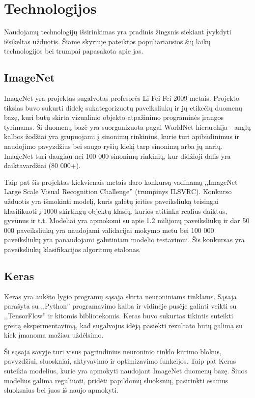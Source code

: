 \documentclass{VUMIFPSkursinis}
\begin{document}
\section{Technologijos}
Naudojamų technologijų išsirinkimas yra pradinis žingsnis siekiant įvykdyti išsikeltas užduotis. Šiame skyriuje pateiktos populiariausios šių laikų technologijos 
bei trumpai papasakota apie jas.

\subsection{ImageNet}
ImageNet yra projektas sugalvotas profesorės Li Fei-Fei 2009 metais. Projekto tikslas buvo sukurti didelę sukategorizuotų paveiksliukų ir jų etikečių duomenų bazę, 
kuri butų skirta vizualinio objekto atpažinimo programinės įrangos tyrimams. Ši duomenų bazė yra suorganizuota pagal WorldNet hierarchija - anglų kalbos žodžiai 
yra grupuojami į sinonimų rinkinius, kurie turi apibūdinimus ir naudojimo pavyzdžius bei saugo ryšių kiekį tarp sinonimų arba jų narių. ImageNet turi daugiau nei 
100 000 sinonimų rinkinių, kur didžioji dalis yra daiktavardžiai (80 000+). 

Taip pat šis projektas kiekvienais metais daro konkursą vadinamą ,,ImageNet Large Scale Visual Recognition Challenge'' (trumpinys ILSVRC). Konkurso užduotis yra 
išmokinti modelį, kuris galėtų įeities paveiksliuką teisingai klasifikuoti į 1000 skirtingų objektų klasių, kurios atitinka realius daiktus, gyvūnus ir t.t. Modeliai 
yra apmokomi su apie 1.2 milijonų paveiksliukų ir dar 50 000 paveiksliukų yra naudojami validacijai mokymo metu bei 100 000 paveiksliukų yra panaudojami galutiniam 
modelio testavimui. Šis konkursas yra paveiksliukų klasifikacijos algoritmų etalonas.

\subsection{Keras}
Keras yra aukšto lygio programų sąsaja skirta neuroniniams tinklams. Sąsaja parašyta su ,,Python'' programavimo kalba ir vidinėje pusėje galinti veikti su ,,TensorFlow'' 
ir kitomis bibliotekomis. Keras buvo sukurtas tikintis suteikti greitą ekspermentavimą, kad sugalvojus idėją pasiekti rezultato būtų galima su kiek įmanoma mažiau uždėlsimo.

Ši sąsaja savyje turi visus pagrindinius neuroninio tinklo kūrimo blokus, pavyzdžiui, sluoskniai, aktyvavimo ir optimizavimo funkcijos. Taip pat Keras suteikia modelius, 
kurie yra apmokyti naudojant ImageNet duomenų bazę. Šiuos modelius galima reguliuoti, pridėti papildomų sluoksnių, pasirinkti esamus sluoksnius bei juos iš naujo apmokyti.
\end{document}
